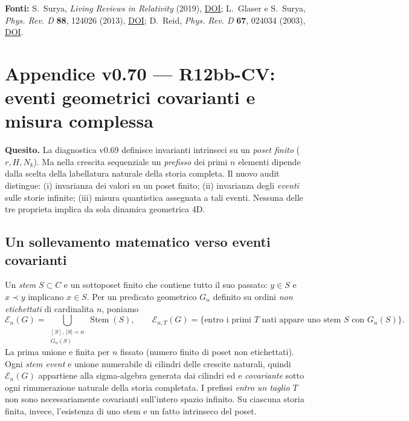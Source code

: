 \documentclass[11pt,a4paper]{article}
\begin{document}
\textbf{Fonti:} S.~Surya, \emph{Living Reviews in Relativity} (2019), \href{https://doi.org/10.1007/s41114-019-0023-1}{DOI}; L.~Glaser e S.~Surya, \emph{Phys. Rev. D} \textbf{88}, 124026 (2013), \href{https://doi.org/10.1103/PhysRevD.88.124026}{DOI}; D.~Reid, \emph{Phys. Rev. D} \textbf{67}, 024034 (2003), \href{https://doi.org/10.1103/PhysRevD.67.024034}{DOI}.


\clearpage
\section*{Appendice v0.70 --- R12bb-CV: eventi geometrici covarianti e misura complessa}
\textbf{Quesito.} La diagnostica v0.69 definisce invarianti intrinseci su un \emph{poset finito} ($r,H,N_k$). Ma nella crescita sequenziale un \emph{prefisso} dei primi $n$ elementi dipende dalla scelta della labellatura naturale della storia completa. Il nuovo audit distingue: (i) invarianza dei valori su un poset finito; (ii) invarianza degli \emph{eventi} sulle storie infinite; (iii) misura quantistica assegnata a tali eventi. Nessuna delle tre proprieta implica da sola dinamica geometrica 4D.

\subsection*{Un sollevamento matematico verso eventi covarianti}
Un \emph{stem} $S\subset C$ e un sottoposet finito che contiene tutto il suo passato: $y\in S$ e $x\prec y$ implicano $x\in S$. Per un predicato geometrico $G_n$ definito su ordini \emph{non etichettati} di cardinalita $n$, poniamo
\begin{equation}
 \mathcal E_n(G)=\bigcup_{\substack{[S],\,|S|=n\\G_n(S)}}\operatorname{Stem}(S),\qquad
 \mathcal E_{n,T}(G)=\{\text{entro i primi $T$ nati appare uno stem $S$ con $G_n(S)$}\}.
 \tag{CV.1}
\end{equation}
La prima unione e finita per $n$ fissato (numero finito di poset non etichettati). Ogni \emph{stem event} e unione numerabile di cilindri delle crescite naturali, quindi $\mathcal E_n(G)$ appartiene alla sigma-algebra generata dai cilindri ed e \emph{covariante} sotto ogni rinumerazione naturale della storia completata. I prefissi \emph{entro un taglio $T$} non sono necessariamente covarianti sull'intero spazio infinito. Su ciascuna storia finita, invece, l'esistenza di uno stem e un fatto intrinseco del poset.
\end{document}
